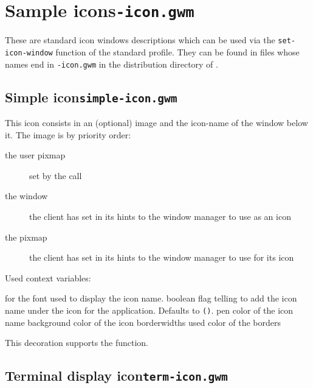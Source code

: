\section{Sample icons\hfill{\tt *-icon.gwm}}
\label{standard-icons}

These are standard icon windows descriptions which can be used via the
\verb"set-icon-window" function of the standard profile. They can be found in
files whose names end in {\tt -icon.gwm} in the distribution directory of
{\GWM}.

\subsection{Simple icon\hfill{\tt simple-icon.gwm}}
\label{simple-icon}

This icon consists in an (optional) image and the icon-name of the
window below it. The image is by priority order:

\begin{description}
\item[the user pixmap] set by the  call
\item[the window] the client has set in its hints to the window manager to
use as an icon
\item[the pixmap] the client has set in its hints to the window manager to
use for its icon
\end{description}

Used context variables:

\begin{description}
 for the font used to display the icon name.
 boolean flag telling to add the icon name under
the icon for the application. Defaults to \verb"()". 
 pen color of the icon name
 background color of the icon
 borderwidths used
 color of the borders
\end{description}

This decoration supports the  function.

\subsection{Terminal display icon\hfill{\tt term-icon.gwm}}
\label{term-icon}

\centerline{}

